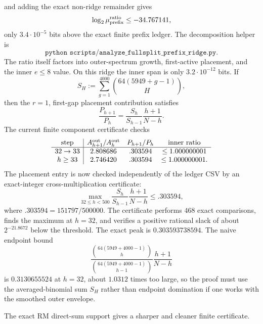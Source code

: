 and adding the exact non-ridge remainder gives
\[
\log_2\mu_{\rm prefix}^{\rm ratio}\le -34.767141,
\]
only \(3.4\cdot10^{-5}\) bits above the exact finite prefix ledger.  The decomposition helper is
\[
\texttt{python scripts/analyze\_fullsplit\_prefix\_ridge.py}.
\]
The ratio itself factors into outer-spectrum growth, first-active placement, and the inner \(e\le8\) value.  On this
ridge the inner span is only \(3.2\cdot10^{-12}\) bits.  If
\[
S_H:=\sum_{g=1}^{4000}\binom{64(5949+g-1)}{H},
\]
then the \(r=1\), first-gap placement contribution satisfies
\[
\frac{P_{h+1}}{P_h}
=
\frac{S_h}{S_{h-1}}\frac{h+1}{N-h}.
\]
The current finite component certificate checks
\[
\begin{array}{c|ccc}
\text{step} & A_{h+1}^{\rm out}/A_h^{\rm out} & P_{h+1}/P_h & \text{inner ratio}\\
\hline
32\to33 & 2.808686 & .303594 & \le 1.000000001\\
h\ge33 & 2.746420 & .303594 & \le 1.000000001.
\end{array}
\]
The placement entry is now checked independently of the ledger CSV by an exact-integer cross-multiplication certificate:
\[
\max_{32\le h<500}\frac{S_h}{S_{h-1}}\frac{h+1}{N-h}
\le .303594,
\]
where \(.303594=151797/500000\).  The certificate performs \(468\) exact comparisons, finds the maximum at
\(h=32\), and verifies a positive rational slack of about \(2^{-21.8672}\) below the threshold.  The exact peak is
\(0.303593738594\).  The naive endpoint bound
\[
\frac{\binom{64(5949+4000-1)}{h}}{\binom{64(5949+4000-1)}{h-1}}\frac{h+1}{N-h}
\]
is \(0.3130655524\) at \(h=32\), about \(1.0312\) times too large, so the proof must use the averaged-binomial sum
\(S_H\) rather than endpoint domination if one works with the smoothed outer envelope.

The exact RM direct-sum support gives a sharper and cleaner finite certificate.

